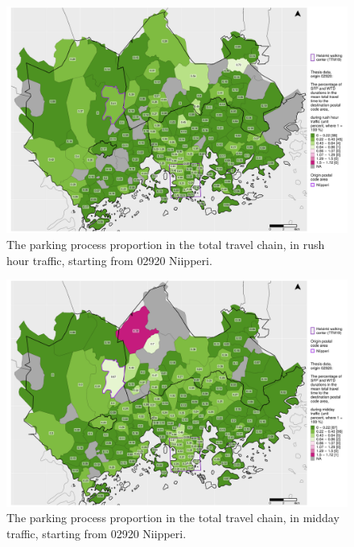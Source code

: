 \begin{figure}[H]%
    \centering
    \includegraphics[trim={0.9cm 0.3cm 0.25cm 0.3cm},clip,width=\textwidth]{images/compare_traveltimes_mapfill-msc_r_pct_fromzip-02920_28-09-2020.png}
    \caption[Parking process proportion from Niipperi, rush hour traffic]{The parking process proportion in the total travel chain, in rush hour traffic, starting from 02920 Niipperi.}%
    \label{fig:compare_msc_r_pct_02920}%
\end{figure}

\begin{figure}[H]%
    \centering
    \includegraphics[trim={0.9cm 0.3cm 0.25cm 0.3cm},clip,width=\textwidth]{images/compare_traveltimes_mapfill-msc_m_pct_fromzip-02920_28-09-2020.png}
    \caption[Parking process proportion from Niipperi, midday traffic]{The parking process proportion in the total travel chain, in midday traffic, starting from 02920 Niipperi.}%
    \label{fig:compare_msc_m_pct_02920}%
\end{figure}

